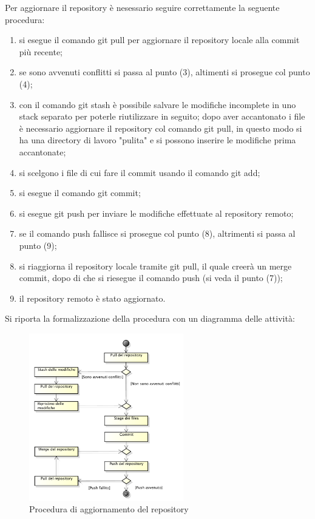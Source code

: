 					Per aggiornare il repository è nesessario seguire correttamente la seguente procedura:
					\begin{enumerate}
						\item si esegue il comando git pull per aggiornare il repository locale alla commit più recente;
						\item se sono avvenuti conflitti si passa al punto (3), altimenti si prosegue col punto (4);
						\item con il comando git stash è possibile salvare le modifiche incomplete in uno stack separato per poterle riutilizzare in seguito; dopo aver accantonato i file è necessario aggiornare il repository col comando git pull, in questo modo si ha una directory di lavoro "pulita" e si possono inserire le modifiche prima accantonate;
						\item si scelgono i file di cui fare il commit usando il comando git add;
						\item si esegue il comando git commit;
						\item si esegue git push per inviare le modifiche effettuate al repository remoto;
						\item se il comando push fallisce si prosegue col punto (8), altrimenti si passa al punto (9);
						\item si riaggiorna il repository locale tramite git pull, il quale creerà un merge commit, dopo di che si riesegue il comando push (si veda il punto (7));
						\item il repository remoto è stato aggiornato.
					\end{enumerate}
					Si riporta la formalizzazione della procedura con un diagramma delle attività:
					\begin{figure}[H]
						\centering
						\includegraphics[width=0.6\textwidth]{NormeDiProgetto/Pics/Commit}
						\caption{Procedura di aggiornamento del repository}
					\end{figure}
